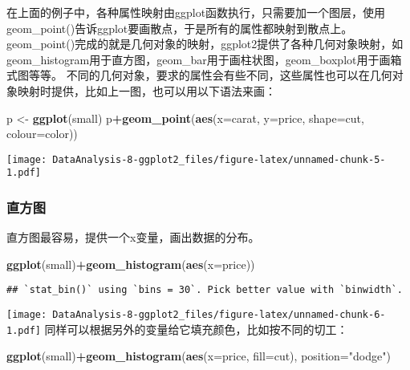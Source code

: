 \documentclass[]{article}
\newenvironment{Shaded}{\begin{snugshade}}{\end{snugshade}}
\newcommand{\KeywordTok}[1]{\textcolor[rgb]{0.13,0.29,0.53}{\textbf{#1}}}
\newcommand{\DataTypeTok}[1]{\textcolor[rgb]{0.13,0.29,0.53}{#1}}
\newcommand{\StringTok}[1]{\textcolor[rgb]{0.31,0.60,0.02}{#1}}
\newcommand{\OperatorTok}[1]{\textcolor[rgb]{0.81,0.36,0.00}{\textbf{#1}}}
\newcommand{\NormalTok}[1]{#1}
\begin{document}
在上面的例子中，各种属性映射由ggplot函数执行，只需要加一个图层，使用geom\_point()告诉ggplot要画散点，于是所有的属性都映射到散点上。
geom\_point()完成的就是几何对象的映射，ggplot2提供了各种几何对象映射，如geom\_histogram用于直方图，geom\_bar用于画柱状图，geom\_boxplot用于画箱式图等等。
不同的几何对象，要求的属性会有些不同，这些属性也可以在几何对象映射时提供，比如上一图，也可以用以下语法来画：

\begin{Shaded}
\begin{Highlighting}[]
\NormalTok{p <-}\StringTok{ }\KeywordTok{ggplot}\NormalTok{(small) }
\NormalTok{p}\OperatorTok{+}\KeywordTok{geom_point}\NormalTok{(}\KeywordTok{aes}\NormalTok{(}\DataTypeTok{x=}\NormalTok{carat, }\DataTypeTok{y=}\NormalTok{price, }\DataTypeTok{shape=}\NormalTok{cut, }\DataTypeTok{colour=}\NormalTok{color))}
\end{Highlighting}
\end{Shaded}

\texttt{[image: DataAnalysis-8-ggplot2\_files/figure-latex/unnamed-chunk-5-1.pdf]}

\subsubsection{直方图}

直方图最容易，提供一个x变量，画出数据的分布。

\begin{Shaded}
\begin{Highlighting}[]
\KeywordTok{ggplot}\NormalTok{(small)}\OperatorTok{+}\KeywordTok{geom_histogram}\NormalTok{(}\KeywordTok{aes}\NormalTok{(}\DataTypeTok{x=}\NormalTok{price))}
\end{Highlighting}
\end{Shaded}

\begin{verbatim}
## `stat_bin()` using `bins = 30`. Pick better value with `binwidth`.
\end{verbatim}

\texttt{[image: DataAnalysis-8-ggplot2\_files/figure-latex/unnamed-chunk-6-1.pdf]}
同样可以根据另外的变量给它填充颜色，比如按不同的切工：

\begin{Shaded}
\begin{Highlighting}[]
\KeywordTok{ggplot}\NormalTok{(small)}\OperatorTok{+}\KeywordTok{geom_histogram}\NormalTok{(}\KeywordTok{aes}\NormalTok{(}\DataTypeTok{x=}\NormalTok{price, }\DataTypeTok{fill=}\NormalTok{cut), }\DataTypeTok{position=}\StringTok{"dodge"}\NormalTok{)}
\end{Highlighting}
\end{Shaded}
\end{document}
